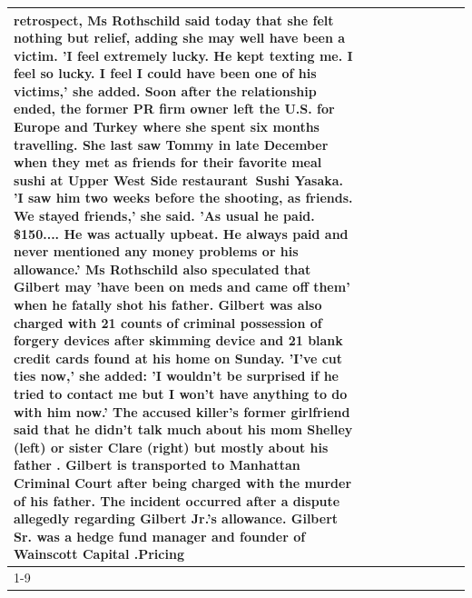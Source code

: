 \begin{table}[H]
\begin{tabular}{lllrlllll}
retrospect, Ms Rothschild said today that she felt nothing but relief, adding she may well have been a victim. 'I feel extremely lucky. He kept texting me. I feel so lucky. I feel I could have been one of his victims,' she added. Soon after the relationship ended, the former PR firm owner left the U.S. for Europe and Turkey where she spent six months  travelling. She last saw Tommy in late December when they met as friends for their favorite meal sushi at Upper West Side restaurant Sushi Yasaka. 'I saw him two weeks before the shooting, as friends. We stayed friends,' she said. 'As usual he paid. \$150.... He was actually upbeat. He always paid and never mentioned any money problems or his allowance.' Ms Rothschild also speculated that Gilbert may 'have been on meds and came off them' when he fatally shot his father. Gilbert was also charged with 21 counts of criminal possession of forgery devices after skimming device and 21 blank credit cards found at his home on Sunday. 'I've cut ties now,' she added: 'I wouldn’t be surprised if he tried to contact me but I won’t have anything to do with him now.' The accused killer's former girlfriend said that he didn't talk much about his mom Shelley (left) or sister Clare (right) but mostly about his father . Gilbert is transported to Manhattan Criminal Court  after being charged with the murder of his father. The incident occurred after a dispute allegedly regarding Gilbert Jr.'s allowance. Gilbert Sr. was a hedge fund manager and founder of Wainscott Capital .Pricing \\
\cline{1-9}

\end{tabular}
\end{table}
